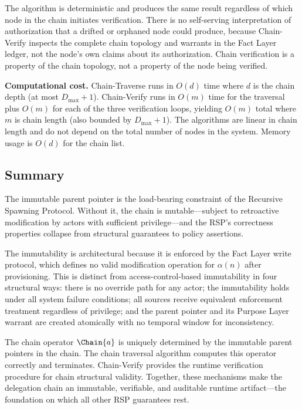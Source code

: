 The algorithm is deterministic and produces the same result regardless of which node in the chain initiates verification. There is no self-serving interpretation of authorization that a drifted or orphaned node could produce, because Chain-Verify inspects the complete chain topology and warrants in the Fact Layer ledger, not the node's own claims about its authorization. Chain verification is a property of the chain topology, not a property of the node being verified.

\bigskip
\noindent\textbf{Computational cost.} Chain-Traverse runs in $O(d)$ time where $d$ is the chain depth (at most $D_{\max} + 1$). Chain-Verify runs in $O(m)$ time for the traversal plus $O(m)$ for each of the three verification loops, yielding $O(m)$ total where $m$ is chain length (also bounded by $D_{\max} + 1$). The algorithms are linear in chain length and do not depend on the total number of nodes in the system. Memory usage is $O(d)$ for the chain list.

\subsection{Summary}

The immutable parent pointer is the load-bearing constraint of the Recursive Spawning Protocol. Without it, the chain is mutable---subject to retroactive modification by actors with sufficient privilege---and the RSP's correctness properties collapse from structural guarantees to policy assertions.

The immutability is architectural because it is enforced by the Fact Layer write protocol, which defines no valid modification operation for $\alpha(n)$ after provisioning. This is distinct from access-control-based immutability in four structural ways: there is no override path for any actor; the immutability holds under all system failure conditions; all sources receive equivalent enforcement treatment regardless of privilege; and the parent pointer and its Purpose Layer warrant are created atomically with no temporal window for inconsistency.

The chain operator $\Chain{a}$ is uniquely determined by the immutable parent pointers in the chain. The chain traversal algorithm computes this operator correctly and terminates. Chain-Verify provides the runtime verification procedure for chain structural validity. Together, these mechanisms make the delegation chain an immutable, verifiable, and auditable runtime artifact---the foundation on which all other RSP guarantees rest.
